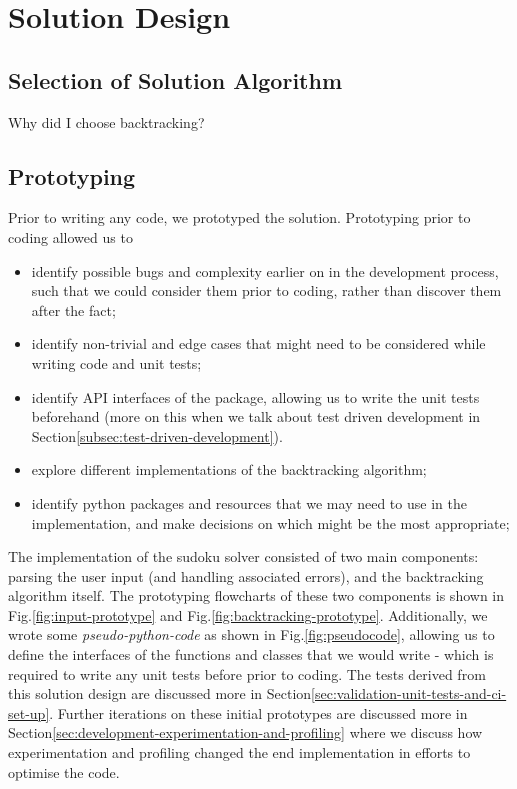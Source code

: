 
\section{Solution Design}\label{sec:solution-design}
    \subsection{Selection of Solution Algorithm}\label{subsec:solution-algorithm}
    Why did I choose backtracking?

    \subsection{Prototyping}\label{subsec:prototyping}
    Prior to writing any code, we prototyped the solution.
    Prototyping prior to coding allowed us to
    \begin{itemize}
        \item identify possible bugs and complexity earlier on in the development process, such that we could consider them
        prior to coding, rather than discover them after the fact;
        \item identify non-trivial and edge cases that might need to be considered while writing code and unit tests;
        \item identify API interfaces of the package, allowing us to write the unit tests beforehand (more on this when
        we talk about test driven development in Section\eqref{subsec:test-driven-development}).
        \item explore different implementations of the backtracking algorithm;
        \item identify python packages and resources that we may need to use in the implementation, and make decisions on which
        might be the most appropriate;
    \end{itemize}
    The implementation of the sudoku solver consisted of two main components: parsing the user input (and handling
    associated errors), and the backtracking algorithm itself.
    The prototyping flowcharts of these two components is shown in Fig.\eqref{fig:input-prototype} and Fig.\eqref{fig:backtracking-prototype}.
    Additionally, we wrote some \textit{pseudo-python-code} as shown in Fig.\eqref{fig:pseudocode}, allowing us to define
    the interfaces of the functions and classes that we would write - which is required to write any unit tests before prior
    to coding.
    The tests derived from this solution design are discussed more in Section\eqref{sec:validation-unit-tests-and-ci-set-up}.
    Further iterations on these initial prototypes are discussed more in Section\eqref{sec:development-experimentation-and-profiling}
    where we discuss how experimentation and profiling changed the end implementation in efforts to optimise the code.

